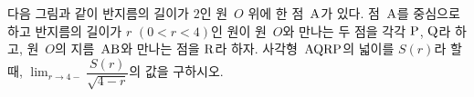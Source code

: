 다음 그림과 같이 반지름의 길이가 $2$인 원~$O$ 위에 한 점~$\mathrm{A}$가 있다. 점~$\mathrm{A}$를 중심으로 하고 반지름의 길이가 $r$ $(0<r<4)$인 원이 원~$O$와 만나는 두 점을 각각 $\mathrm{P}$, $\mathrm{Q}$라 하고, 원~$O$의 지름~$\mathrm{AB}$와 만나는 점을 $\mathrm{R}$라 하자. 사각형~$\mathrm{AQRP}$의 넓이를 $S(r)$라 할 때, $\displaystyle\lim_{r\to 4-}\dfrac{S(r)}{\sqrt{4-r}}$의 값을 구하시오.
\par\smallskip\begin{center}\resizebox{\ifdim\width>\linewidth\linewidth\else\width\fi}{!}{}\end{center}
